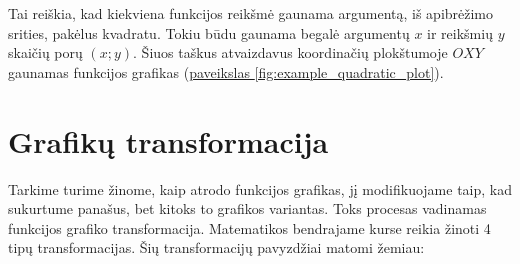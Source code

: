 \documentclass[nobib]{tufte-handout}
\begin{document}
Tai reiškia, kad kiekviena funkcijos reikšmė gaunama argumentą, iš apibrėžimo
srities, pakėlus kvadratu. Tokiu būdu gaunama begalė argumentų $x$ ir reikšmių
$y$ skaičių porų
$(x; y)$. Šiuos taškus atvaizdavus koordinačių plokštumoje $OXY$ gaunamas
funkcijos grafikas (\hyperref[fig:example_quadratic_plot]{paveikslas
  \ref*{fig:example_quadratic_plot}}).

\section{Grafikų transformacija}\label{sec:graph_transformation}

Tarkime turime žinome, kaip atrodo funkcijos grafikas, jį modifikuojame taip,
kad sukurtume panašus, bet kitoks to grafikos variantas. Toks procesas
vadinamas funkcijos grafiko transformacija. Matematikos bendrajame kurse reikia
žinoti 4 tipų transformacijas. Šių transformacijų pavyzdžiai matomi žemiau:
\end{document}
